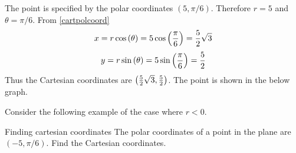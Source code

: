 \begin{solution}
The point is specified by the polar coordinates $\left( 5,\pi /6\right)$. Therefore $r=5$ and $\theta = \pi /6$. 
From \ref{cartpolcoord}
\[
x= r \cos \left( \theta \right)= 5\cos \left( \vspace{0.05in}\frac{\pi }{6}\right) = \vspace{0.05in}\frac{5}{2}\sqrt{3}
\]
\[
y= r \sin \left( \theta \right) = 5\sin \left( \vspace{0.05in}\frac{\pi }{6}\right) = \vspace{0.05in}\frac{5}{2}
\]
Thus the Cartesian coordinates are $\left( \vspace{0.05in}\frac{5}{2}\sqrt{3}, \vspace{0.05in}\frac{5}{2}\right)$. The point is shown in the below graph. 

\begin{center}
\end{center}
\end{solution}

Consider the following example of the case where $r < 0$. 

\begin{example}{Finding cartesian coordinates}{}
The polar coordinates of a point in the plane are $\left( -5,\pi /6\right) .$
Find the Cartesian coordinates.
\end{example}

